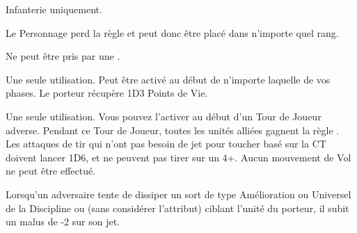 \endpricelist

\armyenchanteditems

\startpricelist

Infanterie uniquement.

Le Personnage perd la règle \firstinrank{} et peut donc être placé dans n'importe quel rang.

Ne peut être pris par une \largetarget{}.

Une seule utilisation. Peut être activé au début de n'importe laquelle de vos phases. Le porteur récupère 1D3 Points de Vie.

\endpricelist

\armymagicalbanners

\startpricelist

Une seule utilisation. Vous pouvez l'activer au début d'un Tour de Joueur adverse. Pendant ce Tour de Joueur, toutes les unités alliées gagnent la règle \hardtarget{}. Les attaques de tir qui n'ont pas besoin de jet pour toucher basé sur la CT doivent lancer 1D6, et ne peuvent pas tirer sur un 4+. Aucun mouvement de Vol ne peut être effectué.

Lorsqu'un adversaire tente de dissiper un sort de type Amélioration ou Universel de la Discipline \ruin{} ou \disease{} (sans considérer l'attribut) ciblant l'unité du porteur, il subit un malus de -2 sur son jet.

\endpricelist

\closearmymagicalitems








\quickrefsheettitle

